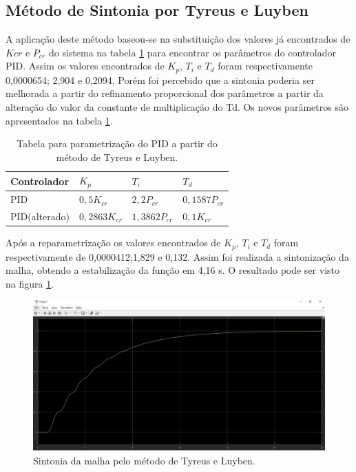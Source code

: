 \documentclass[article,12pt,oneside,a4paper,english,brazil,sumario=tradicional]{abntex2}
\begin{document}
\subsection{\large Método de Sintonia por Tyreus e Luyben}

A aplicação deste método baseou-se na substituição dos valores já encontrados de $K{cr}$ e $P_{cr}$ do sistema na tabela \ref{tl} para encontrar os parâmetros do controlador PID. Assim os valores encontrados de $K_p$, $T_i$ e $T_d$ foram respectivamente 0,0000654; 2,904 e 0,2094. Porém foi percebido que a sintonia poderia ser melhorada a partir do refinamento proporcional dos parâmetros a partir da alteração do valor da constante de multiplicação do Td. Os novos parâmetros são apresentados na tabela \ref{tl}.
\begin{table}[H]
\centering
\caption{ Tabela para parametrização do PID a partir do método de Tyreus e Luyben.}
\begin{tabular}{|l|l|l|l|}
\hline
Controlador  & $K_p$ & $T_i$ & $T_d$ \\\hline
PID& $0,5K_{cr}$ & $2,2 P_{cr}$ &  $0,1587 P_{cr}$ \\\hline
PID(alterado)&$0,2863 K_{cr}$ &$1,3862 P_{cr}$ & $0,1 K_{cr}$  \\\hline

\end{tabular}

\label{tl}
\end{table}

Após a reparametrização os valores encontrados de $K_p$, $T_i$ e $T_d$ foram respectivamente de  0,0000412;1,829 e 0,132. Assim foi realizada a sintonização da malha, obtendo a estabilização da função em 4,16 s. O resultado pode ser visto na figura \ref{tlfig}.

\begin{figure}[H]
    \centering
    \includegraphics[scale=0.26]{tl.jpg}
    \caption{Sintonia da malha pelo método de Tyreus e Luyben.}
    \label{tlfig}
\end{figure}
\end{document}
